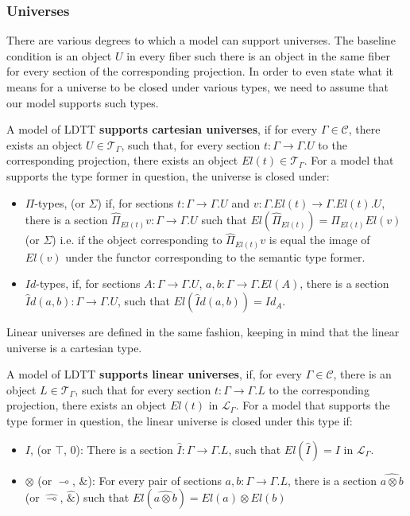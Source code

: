 \subsubsection{Universes}
There are various degrees to which a model can support universes. The baseline condition is an object $U$ in every fiber such there is an object in the same fiber for every section of the corresponding projection. In order to even state what it means for a universe to be closed under various types, we need to assume that our model supports such types.
\begin{defn}A model of LDTT \textbf{supports cartesian universes}, if for every $\Gamma \in \mathcal{C}$, there exists an object $U \in \mathcal{T}_{\Gamma}$, such that, for every section $t : \Gamma \to \Gamma.U$ to the corresponding projection, there exists an object $El(t) \in \mathcal{T}_{\Gamma}$. For a model that supports the type former in question, the universe is closed under:
  \begin{itemize}
  \item $\Pi$-types, (or $\Sigma$) if, for sections $t : \Gamma \to \Gamma.U$ and $v : \Gamma.El(t) \to \Gamma.El(t).U$, there is a section $\hat \Pi_{El(t)}v : \Gamma \to \Gamma.U$ such that $El(\hat \Pi_{El(t)}) = \Pi_{El(t)}El(v)$ (or $\Sigma$) i.e. if the object corresponding to $\hat \Pi_{El(t)}v$ is equal the image of $El(v)$ under the functor corresponding to the semantic type former.
  \item $Id$-types, if, for sections $A : \Gamma \to \Gamma.U$, $a, b : \Gamma \to \Gamma.El(A)$, there is a section $\hat Id(a, b) : \Gamma \to \Gamma.U$, such that $El(\hat Id(a, b)) = Id_A$.
  \end{itemize}
\end{defn}
Linear universes are defined in the same fashion, keeping in mind that the linear universe is a cartesian type.
\begin{defn}
  A model of LDTT \textbf{supports linear universes}, if, for every $\Gamma \in \mathcal{C}$, there is an object $L \in \mathcal{T}_{\Gamma}$, such that for every section $t : \Gamma \to \Gamma.L$ to the corresponding projection, there exists an object $El(t)$ in $\mathcal{L}_{\Gamma}$. For a model that supports the type former in question, the linear universe is closed under this type if:
  \begin{itemize}
    \item $I$, (or $\top$, $0$): There is a section $\hat I : \Gamma \to \Gamma.L$, such that $El(\hat I) = I$ in $\mathcal{L}_\Gamma$.
    \item $\otimes$ (or $\multimap$, $\&$): For every pair of sections $a, b : \Gamma \to \Gamma.L$, there is a section $\hat{a\otimes b}$ (or $\hat \multimap$, $\hat \&$) such that $El(\hat{a\otimes b}) = El(a)\otimes El(b)$
    \end{itemize}
  \end{defn}
